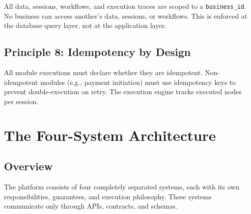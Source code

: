 \documentclass[12pt, a4paper]{report}
\begin{document}
All data, sessions, workflows, and execution traces are scoped to a \texttt{business\_id}. No business can access another's data, sessions, or workflows. This is enforced at the database query layer, not at the application layer.

\section{Principle 8: Idempotency by Design}

All module executions must declare whether they are idempotent. Non-idempotent modules (e.g., payment initiation) must use idempotency keys to prevent double-execution on retry. The execution engine tracks executed nodes per session.

\chapter{The Four-System Architecture}

\section{Overview}

The platform consists of four completely separated systems, each with its own responsibilities, guarantees, and execution philosophy. These systems communicate only through APIs, contracts, and schemas.
\end{document}
